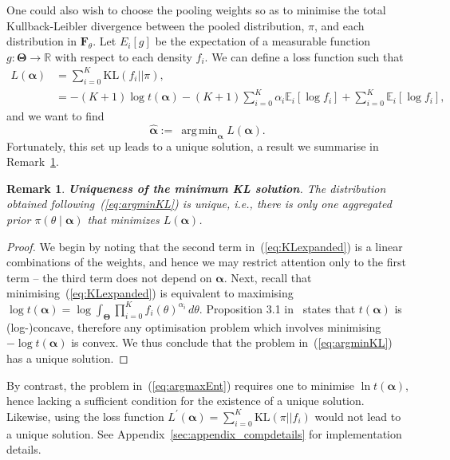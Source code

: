 \documentclass[12pt]{article}
\DeclareMathOperator*{\argmin}{arg\,min}
\newtheorem{remark}{Remark}[]
\begin{document}
One could also wish to choose the pooling weights so as to minimise the total Kullback-Leibler divergence between the pooled distribution, $\pi$, and each distribution in $\mathbf{F}_{\theta}$.
Let $E_i[g]$ be the expectation of a measurable function $g: \boldsymbol{\Theta} \to \mathbb{R}$ with respect to each density $f_i$.
We can define a loss function such that
\begin{align}
\nonumber
L(\boldsymbol\alpha) &= \sum_{i=0}^K  \text{KL}(f_i || \pi ), \\
\label{eq:KLexpanded}
     &= - (K+1)\log t(\boldsymbol\alpha) - (K+1) \sum_{i=0}^K\alpha_i \mathbb{E}_i [\log f_i ]  + \sum_{i=0}^K \mathbb{E}_i\left[\log f_i\right], 
\end{align}
and we want to find 
\begin{equation}
\label{eq:argminKL}
    \hat{\boldsymbol\alpha}:= \:\argmin_{\boldsymbol\alpha} L(\boldsymbol\alpha).   
\end{equation}
Fortunately, this set up leads to a unique solution, a result we summarise in Remark~\ref{rmk:uniqueness}.
\begin{remark}
\label{rmk:uniqueness}
\textbf{Uniqueness of the minimum KL solution}.
 The distribution obtained following~(\ref{eq:argminKL}) is unique, i.e., there is only one aggregated prior $\pi(\theta \mid \boldsymbol\alpha)$ that minimizes $L(\boldsymbol\alpha)$.
\end{remark}
\begin{proof}
We begin by noting that the second term in~(\ref{eq:KLexpanded}) is a linear combinations of the weights, and hence we may restrict attention only to the first term -- the third term does not depend on $\boldsymbol{\alpha}$.
Next, recall that minimising~(\ref{eq:KLexpanded}) is equivalent to maximising $\log t(\boldsymbol\alpha) = \log\int_{\boldsymbol\Theta}\prod_{i=0}^{K}f_i(\theta)^{\alpha_i}\, d\theta$.
Proposition 3.1 in~\textcite{Rufo2012A} states that $t(\boldsymbol\alpha)$ is (log-)concave, therefore any optimisation problem which involves minimising $-\log t(\boldsymbol{\alpha})$ is convex.
We thus conclude that the problem in~(\ref{eq:argminKL}) has a unique solution.
\end{proof}
By contrast, the problem in~(\ref{eq:argmaxEnt}) requires one to minimise $\ln t(\boldsymbol\alpha)$, hence lacking a sufficient condition for the existence of a unique solution.
Likewise, using  the loss function $L^\prime(\boldsymbol\alpha) = \sum_{i=0}^K  \text{KL}(\pi ||f_i )$ would not lead to a unique solution.
See Appendix~\ref{sec:appendix_compdetails} for implementation details.
\end{document}
